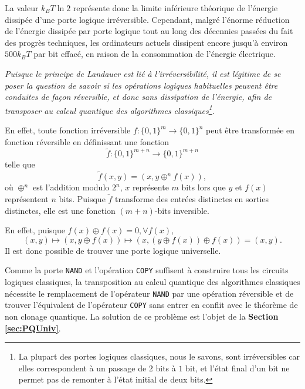 La valeur $k_{B}T\ln2$ représente donc la limite inférieure théorique de
l'énergie dissipée d'une porte logique irréversible. Cependant, malgré l'énorme
réduction de l'énergie dissipée par porte logique tout au long des décennies
passées du fait des progrès techniques, les ordinateurs actuels dissipent encore
jusqu'à environ $500k_{B}T$ par bit effacé, en raison de la consommation de
l'énergie électrique.

\emph{Puisque le principe de Landauer est lié à l'irréversibilité, il est
légitime de se poser la question de savoir si les opérations logiques
habituelles peuvent être conduites de façon réversible, et donc sans dissipation
de l'énergie, afin de transposer au calcul quantique des algorithmes
classiques\footnote{La plupart des portes logiques classiques, nous le savons,
sont irréversibles car elles correspondent à un passage de $2$ bits à $1$ bit,
et l'état final d'un bit ne permet pas de remonter à l'état initial de deux
bits.}.}

En effet, toute fonction irréversible $f:\{0,1\}^{m}\rightarrow\{0,1\}^n$
peut être transformée en fonction réversible en définissant une fonction%
\begin{equation}
\tilde{f}:\{0,1\}^{m+n}\rightarrow\{0,1\}^{m+n}%
\end{equation}
telle que%
\begin{equation}
\tilde{f}(x,y)=(x,y\oplus^n f(x)),
\end{equation}
où $\oplus^n$ est l'addition modulo $2^n$, $x$ représente $m$ bits lors que
$y$ et $f(x)$ représentent $n$ bits. Puisque $\tilde{f}$ transforme des entrées
distinctes en sorties distinctes, elle est une fonction $(m+n)$-bits inversible.

En effet, puisque $f(x)\oplus f(x)=0, \forall f(x)$,
\begin{equation}
(x,y)\mapsto(x,y\oplus f(x))\mapsto(x,(y\oplus f(x))\oplus f(x))=(x,y).
\end{equation}
Il est donc possible de trouver une porte logique universelle.

Comme la porte \texttt{NAND} et l'opération \texttt{COPY} suffisent à
construire tous les circuits logiques classiques, la transposition au calcul
quantique des algorithmes classiques nécessite le remplacement de l'opérateur
\texttt{NAND} par une opération réversible et de trouver l'équivalent de
l'opérateur \texttt{COPY} sans entrer en conflit avec le théorème de non clonage
quantique. La solution de ce problème est l'objet de la \textbf{Section
\ref{sec:PQUniv}}.


